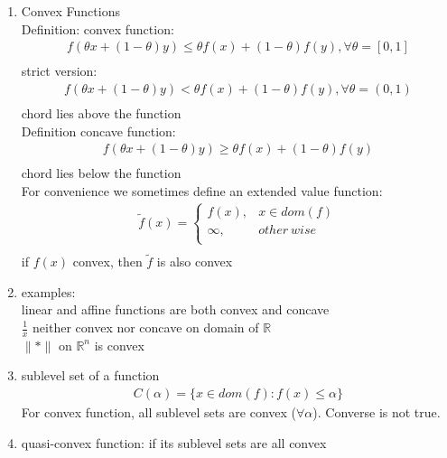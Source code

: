 \documentclass[12pt,letter]{article}
\newcommand{\R}{\mathbb{R}}
\newcommand{\norm}[1]{\|#1\|}
\newcommand{\set}[1]{\{#1\}}
\begin{document}

\begin{enumerate}
\item Convex Functions\\
  Definition: convex function:
  \begin{align*}
    f(\theta x +(1-\theta) y) \leq \theta f(x) + (1-\theta) f(y), \forall \theta = [0,1]\\
  \end{align*}
  strict version:\\
  \begin{align*}
    f(\theta x +(1-\theta) y) < \theta f(x) + (1-\theta) f(y), \forall \theta = (0,1)\\
  \end{align*}
  chord lies above the function\\
  Definition concave function:
  \begin{align*}
    f(\theta x +(1-\theta) y) \geq \theta f(x) + (1-\theta) f(y)\\
  \end{align*}
  chord lies below the function\\
  For convenience we sometimes define an extended value function:\\
  \begin{align*}
    \tilde{f}(x) = \begin{cases}
      f(x), & x \in dom(f)\\
      \infty, & other\ wise\\
    \end{cases}\\
  \end{align*}
  if $f(x)$ convex, then $\tilde{f}$ is also convex\\
\item examples:\\
  linear and affine functions are both convex and concave\\
  $\frac{1}{x}$ neither convex nor concave on domain of $\R$\\
  $\norm{*}$ on $\R^n$ is convex
\item sublevel set of a function
  \begin{align*}
    C(\alpha) = \set{ x \in dom(f): f(x) \leq \alpha}
  \end{align*}
  For convex function, all sublevel sets are convex ($\forall \alpha$). Converse is not true.\\
\item quasi-convex function: if its sublevel sets are all convex

\end{enumerate}
\end{document}
